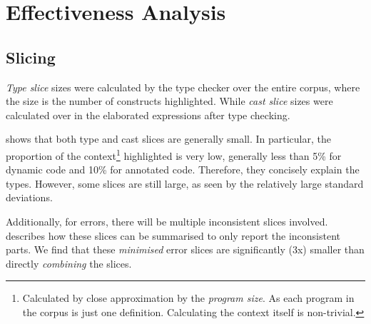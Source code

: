 \section{Effectiveness Analysis}\label{sec:EffectivenessAnalysis}


\subsection{Slicing}
\textit{Type slice} sizes were calculated by the type checker over the entire corpus, where the size is the number of constructs highlighted. While \textit{cast slice} sizes were calculated over in the elaborated expressions after type checking.

 shows that both type and cast slices are generally small. In particular, the proportion of the context\footnote{Calculated by close approximation by the \textit{program size}. As each program in the corpus is just one definition. Calculating the context itself is non-trivial.} highlighted is very low, generally less than 5\% for dynamic code and 10\% for annotated code. Therefore, they concisely explain the types. However, some slices are still large, as seen by the relatively large standard deviations.

Additionally, for errors, there will be multiple inconsistent slices involved.  describes how these slices can be summarised to only report the inconsistent parts. We find that these \textit{minimised} error slices are significantly (3x) smaller than directly \textit{combining} the slices.

